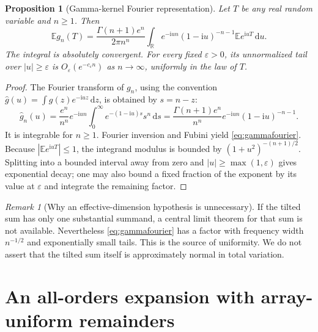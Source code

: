 \documentclass[11pt,a4paper]{article}
\numberwithin{equation}{section}
\newtheorem{proposition}[theorem]{Proposition}
\theoremstyle{definition}\newtheorem{definition}[theorem]{Definition}
\theoremstyle{remark}\newtheorem{remark}[theorem]{Remark}
\newcommand{\E}{\mathbb E}
\newcommand{\dd}{\,\mathrm d}
\newcommand{\ii}{\mathrm i}
\begin{document}
\begin{proposition}[Gamma-kernel Fourier representation]\label{prop:fourier}
Let $T$ be any real random variable and $n\ge1$. Then
\begin{equation}\label{eq:gammafourier}
 \E g_n(T)=\frac{\Gamma(n+1)e^n}{2\pi n^n}
 \int_{\mathbb R}e^{-\ii un}(1-\ii u)^{-n-1}
          \E e^{\ii uT}\dd u.
\end{equation}
The integral is absolutely convergent. For every fixed $\varepsilon>0$, its unnormalized tail over $|u|\ge\varepsilon$ is $O_\varepsilon(e^{-c_\varepsilon n})$ as $n\to\infty$, uniformly in the law of $T$.
\end{proposition}
\begin{proof}
The Fourier transform of $g_n$, using the convention $\widehat g(u)=\int g(z)e^{-\ii uz}\dd z$, is obtained by $s=n-z$:
\[
 \widehat g_n(u)=\frac{e^n}{n^n}e^{-\ii un}
      \int_0^\infty e^{-(1-\ii u)s}s^n\dd s
 =\frac{\Gamma(n+1)e^n}{n^n}e^{-\ii un}(1-\ii u)^{-n-1}.
\]
It is integrable for $n\ge1$. Fourier inversion and Fubini yield \eqref{eq:gammafourier}. Because $|\E e^{\ii uT}|\le1$, the integrand modulus is bounded by $(1+u^2)^{-(n+1)/2}$. Splitting into a bounded interval away from zero and $|u|\ge\max(1,\varepsilon)$ gives exponential decay; one may also bound a fixed fraction of the exponent by its value at $\varepsilon$ and integrate the remaining factor.
\end{proof}

\begin{remark}[Why an effective-dimension hypothesis is unnecessary]
If the tilted sum has only one substantial summand, a central limit theorem for that sum is not available. Nevertheless \eqref{eq:gammafourier} has a factor with frequency width $n^{-1/2}$ and exponentially small tails. This is the source of uniformity. We do not assert that the tilted sum itself is approximately normal in total variation.
\end{remark}

\section{An all-orders expansion with array-uniform remainders}
\label{sec:allorders}
\end{document}
